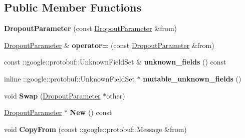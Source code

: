 \subsection*{Public Member Functions}
\begin{DoxyCompactItemize}
\item 
\mbox{\label{classcaffe_1_1_dropout_parameter_a8f508117115113eba227ba9010d27746}} 
{\bfseries Dropout\+Parameter} (const \mbox{\hyperlink{classcaffe_1_1_dropout_parameter}{Dropout\+Parameter}} \&from)
\item 
\mbox{\label{classcaffe_1_1_dropout_parameter_a937af3b546195149d21f6d2be2eab63d}} 
\mbox{\hyperlink{classcaffe_1_1_dropout_parameter}{Dropout\+Parameter}} \& {\bfseries operator=} (const \mbox{\hyperlink{classcaffe_1_1_dropout_parameter}{Dropout\+Parameter}} \&from)
\item 
\mbox{\label{classcaffe_1_1_dropout_parameter_a6afdc3344a6d36ef3f03377a8ad1dc6f}} 
const \+::google\+::protobuf\+::\+Unknown\+Field\+Set \& {\bfseries unknown\+\_\+fields} () const
\item 
\mbox{\label{classcaffe_1_1_dropout_parameter_a2fd73b3fd0fe0371cd26479a256062a7}} 
inline \+::google\+::protobuf\+::\+Unknown\+Field\+Set $\ast$ {\bfseries mutable\+\_\+unknown\+\_\+fields} ()
\item 
\mbox{\label{classcaffe_1_1_dropout_parameter_ad3dbe037e2cb5ef4165c44c2600cba0d}} 
void {\bfseries Swap} (\mbox{\hyperlink{classcaffe_1_1_dropout_parameter}{Dropout\+Parameter}} $\ast$other)
\item 
\mbox{\label{classcaffe_1_1_dropout_parameter_a7835578e0d25f5766ad47a2140a77d28}} 
\mbox{\hyperlink{classcaffe_1_1_dropout_parameter}{Dropout\+Parameter}} $\ast$ {\bfseries New} () const
\item 
\mbox{\label{classcaffe_1_1_dropout_parameter_a2d87399618bd627a1b9045b04d1b0e1a}} 
void {\bfseries Copy\+From} (const \+::google\+::protobuf\+::\+Message \&from)
\item 
\mbox{\label{classcaffe_1_1_dropout_parameter_ab7f3fca21c095254755e81d544fde70c}} 

\end{DoxyCompactItemize}
